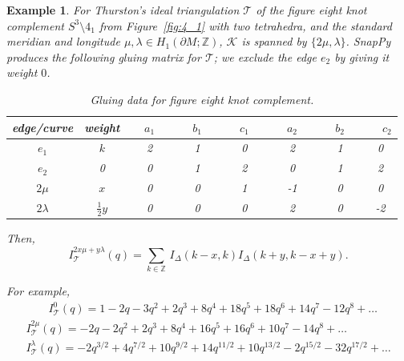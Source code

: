 \documentclass[11pt]{amsart}
\newtheorem{example}[thm]{Example}
\newcommand{\T}{\mathcal{T}}
\newcommand{\bd}{\partial}
\newcommand{\Z}{\mathbb{Z}}
\newcommand{\tet}{I_{\Delta}}
\begin{document}
\begin{example}
For Thurston's ideal triangulation $\T$ of the figure eight knot complement $S^3 \setminus 4_1$ from Figure~\ref{fig:4_1}
with two tetrahedra, and the standard meridian and longitude $\mu,\lambda \in H_1\left(\bd M;\Z\right)$, $\mathcal{K}$ is spanned by $\{2\mu,\lambda\}$. SnapPy produces the following gluing matrix for $\T$; we exclude the edge $e_2$ by giving it weight $0$.

 \begin{table}[h]
\begin{tabular}{|c|c||c|c|c|c|c|c|}
\hline
 edge/curve&weight& ~~$a_1$~~ & ~~$b_1$~~ & ~~$c_1$~~ & ~~$a_2$~~ & ~~$b_2$~~ & ~~$c_2$ \\
\hline
\hline
$e_1$ &$k$ &2 & 1 & 0 & 2 &1 & 0 \\
\hline
$e_2$ &0&0& 1 & 2& 0 & 1 & 2 \\
\hline
$2\mu$ & $x$&0& 0 & 1& -1 & 0 & 0 \\
\hline
$2 \lambda$ &$\frac{1}{2}y$ &0& 0 & 0& 2  & 0 & -2\\
\hline
\end{tabular}
\vspace{0.2cm}
\label{table:Fig8Gluing}
\caption{Gluing data for figure eight knot complement.}
\end{table}

Then,
\begin{equation}\label{eqn:index4_1}
I_{\T}^{2x \mu + y\lambda}\left(q\right)
 = \sum_{k \in \Z} \, \tet\left(k-x,k\right) \tet\left(k+y,k-x+y\right).
\end{equation}

For example,
\begin{gather*}
\qquad I_{\T}^0\left(q\right) =
1-2 q-3 q^2+2 q^3+8 q^4+18 q^5+18 q^6+14 q^7-12 q^8 + \ldots \\
I_{\T}^{2\mu}\left(q\right) =
-2 q-2 q^2+2 q^3+8 q^4+16 q^5+16 q^6+10 q^7-14 q^8+ \ldots \\
I_{\T}^\lambda\left(q\right) = -2 q^{3/2}+4 q^{7/2}+10 q^{9/2}
+14 q^{11/2}+10 q^{13/2}-2 q^{15/2}-32 q^{17/2} + \ldots \\
\end{gather*}
\end{example}
\end{document}
